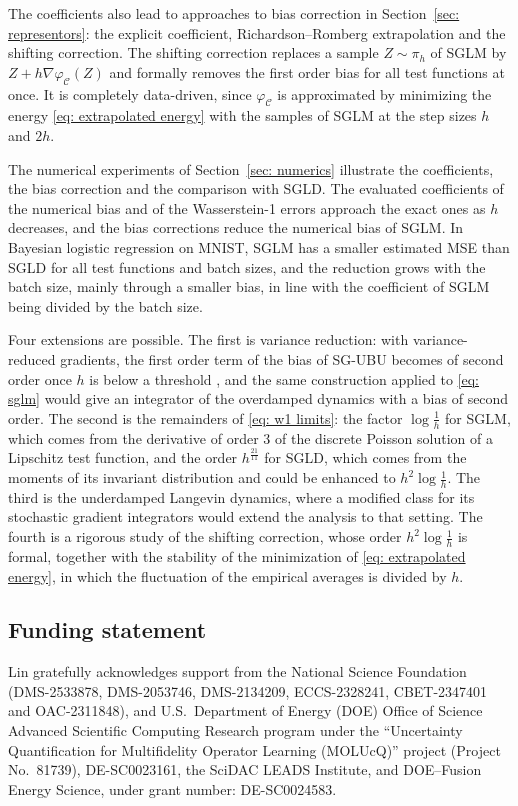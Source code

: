 \documentclass{article}
\numberwithin{equation}{section}
\begin{document}
The coefficients also lead to approaches to bias correction in Section~\ref{sec: representors}: the explicit coefficient, Richardson--Romberg extrapolation and the shifting correction. The shifting correction replaces a sample $Z \sim \pi_h$ of SGLM by $Z + h \nabla \varphi_{\mathcal C}(Z)$ and formally removes the first order bias for all test functions at once. It is completely data-driven, since $\varphi_{\mathcal C}$ is approximated by minimizing the energy \eqref{eq: extrapolated energy} with the samples of SGLM at the step sizes $h$ and $2h$.

The numerical experiments of Section~\ref{sec: numerics} illustrate the coefficients, the bias correction and the comparison with SGLD. The evaluated coefficients of the numerical bias and of the Wasserstein-1 errors approach the exact ones as $h$ decreases, and the bias corrections reduce the numerical bias of SGLM. In Bayesian logistic regression on MNIST, SGLM has a smaller estimated MSE than SGLD for all test functions and batch sizes, and the reduction grows with the batch size, mainly through a smaller bias, in line with the coefficient of SGLM being divided by the batch size.

Four extensions are possible. The first is variance reduction: with variance-reduced gradients, the first order term of the bias of SG-UBU becomes of second order once $h$ is below a threshold \citep{lu2025mse}, and the same construction applied to \eqref{eq: sglm} would give an integrator of the overdamped dynamics with a bias of second order. The second is the remainders of \eqref{eq: w1 limits}: the factor $\log\frac1h$ for SGLM, which comes from the derivative of order $3$ of the discrete Poisson solution of a Lipschitz test function, and the order $h^{\frac{21}{11}}$ for SGLD, which comes from the moments of its invariant distribution and could be enhanced to $h^2 \log\frac1h$. The third is the underdamped Langevin dynamics, where a modified class for its stochastic gradient integrators would extend the analysis to that setting. The fourth is a rigorous study of the shifting correction, whose order $h^2 \log\frac1h$ is formal, together with the stability of the minimization of \eqref{eq: extrapolated energy}, in which the fluctuation of the empirical averages is divided by $h$.

\subsection*{Funding statement}
Lin gratefully acknowledges support from the National Science Foundation (DMS-2533878, DMS-2053746, DMS-2134209, ECCS-2328241, CBET-2347401 and OAC-2311848), and U.S.~Department of Energy (DOE) Office of Science Advanced Scientific Computing Research program under the ``Uncertainty Quantification for Multifidelity Operator Learning (MOLUcQ)'' project (Project No.~81739), DE-SC0023161, the SciDAC LEADS Institute, and DOE--Fusion Energy Science, under grant number: DE-SC0024583.
\end{document}
